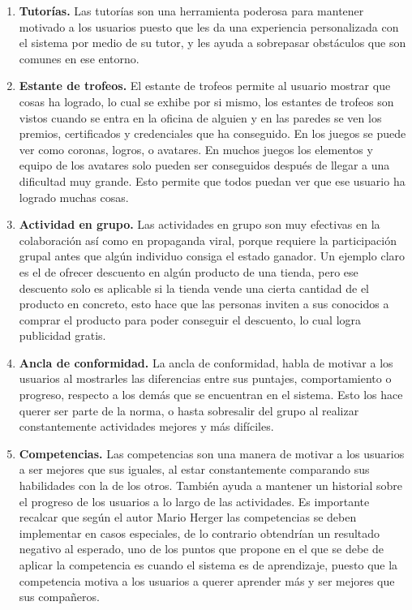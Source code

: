     \begin{enumerate}
        
    \item
    {\bf Tutorías.} \cite[p. 215]{Pctalysis}
        Las tutorías son una herramienta poderosa para mantener motivado a los usuarios
        puesto que les da una experiencia personalizada con el sistema por medio de su
        tutor, y les ayuda a sobrepasar obstáculos que son comunes en ese entorno.
        
    \item
    {\bf Estante de trofeos.} \cite[p. 218]{Octalysis}
        El estante de trofeos permite al usuario mostrar que cosas ha logrado, lo cual
        se exhibe por si mismo, los estantes de trofeos son vistos cuando se entra en
        la oficina de alguien y en las paredes se ven los premios, certificados y
        credenciales que ha conseguido. En los juegos se puede ver como coronas, logros,
        o avatares. En muchos juegos los elementos y equipo de los avatares solo pueden
        ser conseguidos después de llegar a una dificultad muy grande. Esto permite que
        todos puedan ver que ese usuario ha logrado muchas cosas. 
        
    \item
    {\bf Actividad en grupo.} \cite[p. 221]{Octalysis}
        Las actividades en grupo son muy efectivas en la colaboración así como en propaganda
        viral, porque requiere la participación grupal antes que algún individuo consiga
        el estado ganador. Un ejemplo claro es el de ofrecer descuento en algún producto
        de una tienda, pero ese descuento solo es aplicable si la tienda vende una cierta
        cantidad de el producto en concreto, esto hace que las personas inviten a sus
        conocidos a comprar el producto para poder conseguir el descuento, lo cual logra
        publicidad gratis.
        
    \item
    {\bf Ancla de conformidad.} \cite[p. 226]{Octalysis}
        La ancla de conformidad, habla de motivar a los usuarios al mostrarles las diferencias
        entre sus puntajes, comportamiento o progreso, respecto a los demás que se encuentran
        en el sistema. Esto los hace querer ser parte de la norma, o hasta sobresalir del
        grupo al realizar constantemente actividades mejores y más difíciles.
        
    \item
    {\bf Competencias.} \cite[p. 210]{Octalysis}
        Las competencias son una manera de motivar a los usuarios a ser mejores que sus iguales,
        al estar constantemente comparando sus habilidades con la de los otros. También ayuda a
        mantener un historial sobre el progreso de los usuarios a lo largo de las actividades.
        Es importante recalcar que según el autor Mario Herger \cite{libro25} las competencias
        se deben implementar en casos especiales, de lo contrario obtendrían un resultado negativo
        al esperado, uno de los puntos que propone en el que se debe de aplicar la competencia es
        cuando el sistema es de aprendizaje, puesto que la competencia motiva a los usuarios a
        querer aprender más y ser mejores que sus compañeros.
        

\end{enumerate}
